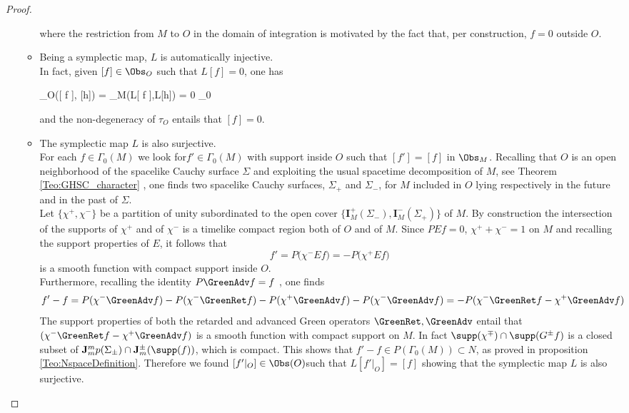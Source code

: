 \documentclass[Main]{subfiles}
\begin{document}
\begin{proof}
\begin{itemize}
\begin{itemize}
\begin{compactdisplaymath}
									\end{compactdisplaymath}
									where the restriction from $M$ to $O$ in the domain of integration is motivated by the fact that, per construction, $f = 0$ outside $O$.
								\item Being a symplectic map, $L$ is automatically injective. \\
									In fact, given $[ f ] \in \Obs_O$ such that $L[ f ] = 0$, one has
									\begin{compactdisplaymath}
										\tau_O([ f ], [h]) = \tau_M(L[ f ],L[h]) = 0 \qquad \forall \: [h] \in \Obs_0
									\end{compactdisplaymath}
									and the non-degeneracy of $\tau_O$ entails that $[ f ] = 0$.
								\item The symplectic map $L$ is also surjective.\\
									For each $f\in \Gamma_0(M)$ we look for$ f' \in \Gamma_0(M)$ with support inside $O$ such that $[f']=[f]$ in $\Obs_M$.
									Recalling that $O$ is an open neighborhood of the spacelike Cauchy surface $\Sigma$ and exploiting the usual spacetime decomposition of $M$, see Theorem \ref{Teo:GHSC_character} , one finds two spacelike Cauchy surfaces, $\Sigma_+$ and $\Sigma_-$, for $M$ included in $O$ lying respectively in the future and in the past of $\Sigma$.\\
									Let $\{\chi^+,\chi^-\}$ be a partition of unity subordinated to the open cover $\{\mathbf{I}^+_M(\Sigma_-), \mathbf{I}^-_M(\Sigma_+)\}$ of $M$.
									By construction the intersection of the supports of $\chi^+$ and of $\chi^-$ is a timelike compact region both of $O$ and of $M$.
									Since $PE f = 0$, $\chi^+ +\chi^-=1$ on $M$ and recalling the support properties of $E$, it follows that
									\begin{displaymath}
									f' = P\big( \chi^- E f \big) =  - P \big( \chi^+ E f \big)
									\end{displaymath}
									is a smooth function with compact support inside $O$.
									\\
									Furthermore, recalling the identity $P \GreenAdv f = f$ , one finds
									\begin{displaymath}
									f' -f = P(\chi^- \GreenAdv f) - P ( \chi^- \GreenRet f ) - P ( \chi^+ \GreenAdv f) - P(\chi^- \GreenAdv f) = - P(\chi^- \GreenRet f - \chi^+ \GreenAdv f )
									\end{displaymath}
									The support properties of both the retarded and advanced Green operators $\GreenRet, \GreenAdv$ entail that $(\chi^-\GreenRet f - \chi^+ \GreenAdv f)$ is a smooth function with compact support on $M$. In fact $\supp(\chi^\mp) \cap \supp(G^\pm f )$ is a closed subset of $\mathbf{J}_m^mp(\Sigma_\pm) \cap \mathbf{J}_m^\pm(\supp(f))$, which is compact.
									This shows that $f' -f \in P(\Gamma_0(M)) \subset N$, as proved in proposition \ref{Teo:NspaceDefinition}.
									Therefore we found $[ f'\vert_O] \in \Obs(O)$such that $L[ f'\vert_O]=[ f ]$ showing that the symplectic map $L$ is also surjective.
						\end{itemize}
					\end{itemize}
				\end{proof}
\end{document}
